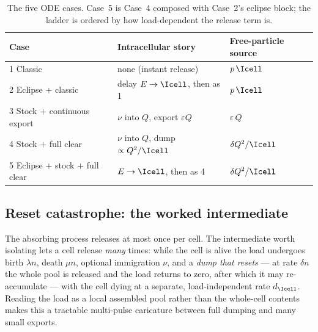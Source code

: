 \begin{table}[htbp]
\centering
\renewcommand{\arraystretch}{1.12}
\small
\begin{tabular}{@{}p{}p{}p{}@{}}
\toprule
Case & Intracellular story & Free-particle source \\
\midrule
1 Classic & none (instant release) & $p\,\Icell$ \\
2 Eclipse $+$ classic & delay $E\to\Icell$, then as 1 & $p\,\Icell$ \\
3 Stock $+$ continuous export & $\nu$ into $Q$, export $\varepsilon Q$ & $\varepsilon\,Q$ \\
4 Stock $+$ full clear & $\nu$ into $Q$, dump $\propto Q^2/\Icell$ & $\delta Q^2/\Icell$ \\
5 Eclipse $+$ stock $+$ full clear & $E\to\Icell$, then as 4 & $\delta Q^2/\Icell$ \\
\bottomrule
\end{tabular}
\caption{The five ODE cases. Case~5 is Case~4 composed with Case~2's
eclipse block; the ladder is ordered by how load-dependent the release
term is.}
\label{p:tab:cases}
\end{table}

\subsection{Reset catastrophe: the worked intermediate}
\label{p:sec:reset}

The absorbing process releases at most once per cell. The intermediate
worth isolating lets a cell release \emph{many} times: while the cell is
alive the load undergoes birth $\lambda n$, death $\mu n$, optional
immigration $\nu$, and a \emph{dump that resets} --- at rate $\delta n$ the
whole pool is released and the load returns to zero, after which it may
re-accumulate --- with the cell dying at a separate, load-independent rate
$d_{\Icell}$. Reading the load as a local assembled pool rather than the
whole-cell contents makes this a tractable multi-pulse caricature between
full dumping and many small exports.


